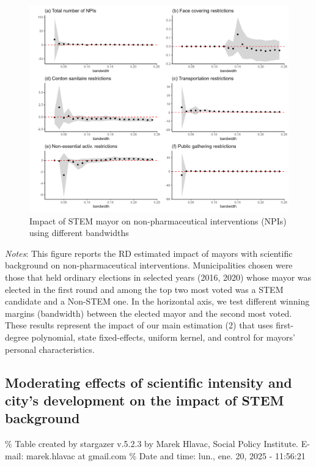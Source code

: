 \documentclass[
  letterpaper,
  DIV=11,
  numbers=noendperiod]{scrartcl}
\begin{document}
\begin{figure}[H]

\caption{Impact of STEM mayor on non-pharmaceutical interventions (NPIs)
using different bandwidths}

{\centering \includegraphics{outputs/figures/npi_rob.png}

}

\end{figure}%

\emph{Notes}: This figure reports the RD estimated impact of mayors with
scientific background on non-pharmaceutical interventions.
Municipalities chosen were those that held ordinary elections in
selected years (2016, 2020) whose mayor was elected in the first round
and among the top two most voted was a STEM candidate and a Non-STEM
one. In the horizontal axis, we test different winning margins
(bandwidth) between the elected mayor and the second most voted. These
results represent the impact of our main estimation (2) that uses
first-degree polynomial, state fixed-effects, uniform kernel, and
control for mayors' personal characteristics.

\subsection{Moderating effects of scientific intensity and city's
development on the impact of STEM
background}\label{moderating-effects-of-scientific-intensity-and-citys-development-on-the-impact-of-stem-background}

\% Table created by stargazer v.5.2.3 by Marek Hlavac, Social Policy
Institute. E-mail: marek.hlavac at gmail.com \% Date and time: lun.,
ene. 20, 2025 - 11:56:21
\end{document}
